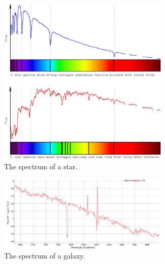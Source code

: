 \documentclass[11pt]{article}
\begin{document}
\begin{figure}[h!]
    \centering
    \begin{subfigure}[b]{0.75\textwidth}
        \centering
        \includegraphics[width=0.9\textwidth,trim={0cm 9.75cm 0cm 0cm},clip]{Images/spectrum.png}
        \caption{The spectrum of a star.}
        \label{fig:stellar_spec}
    \end{subfigure}
    \hfill
    \begin{subfigure}[b]{0.75\textwidth}
        \centering
        \includegraphics[width=0.9\textwidth,trim={0cm 0cm 0cm 1cm},clip]{Images/gal_spec.png}
        \caption{The spectrum of a galaxy.}
        \label{fig:gal_spec}
    \end{subfigure}
    \caption{}
    \label{fig:spec}
\end{figure}
\end{document}
